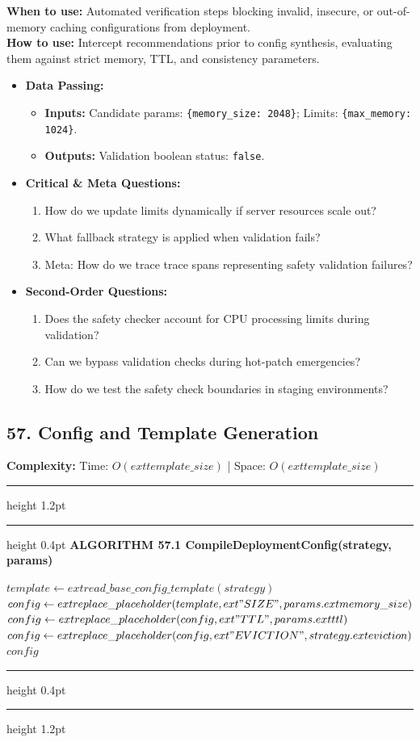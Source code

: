\documentclass[11pt,a4paper]{article}
\newenvironment{textbookalgo}[2]{%
  \par\addvspace{1.2em}\noindent
  \hrule height 1.2pt
  \vspace{1.5pt}
  \hrule height 0.4pt
  \vspace{5pt}
  {\noindent\large\bfseries\sffamily ALGORITHM #1 \quad #2}
  \par\vspace{5pt}
  \RestyleAlgo{plain}
}{%
  \par\vspace{4pt}
  \hrule height 0.4pt
  \vspace{1.5pt}
  \hrule height 1.2pt
  \par\addvspace{1.2em}
}
\theoremstyle{definition}
\begin{document}
\noindent
\textbf{When to use:} Automated verification steps blocking invalid, insecure, or out-of-memory caching configurations from deployment.\\
\textbf{How to use:} Intercept recommendations prior to config synthesis, evaluating them against strict memory, TTL, and consistency parameters.
\begin{itemize}[leftmargin=*]
  \item[] \textbf{Data Passing:}
    \begin{itemize}
      \item \textbf{Inputs:} Candidate params: \texttt{\{memory\_size: 2048\}}; Limits: \texttt{\{max\_memory: 1024\}}.
      \item \textbf{Outputs:} Validation boolean status: \texttt{false}.
    \end{itemize}
  \item[] \textbf{Critical \& Meta Questions:}
  \begin{enumerate}
    \item How do we update limits dynamically if server resources scale out?
    \item What fallback strategy is applied when validation fails?
    \item Meta: How do we trace trace spans representing safety validation failures?
  \end{enumerate}
  \item[] \textbf{Second-Order Questions:}
  \begin{enumerate}
    \item Does the safety checker account for CPU processing limits during validation?
    \item Can we bypass validation checks during hot-patch emergencies?
    \item How do we test the safety check boundaries in staging environments?
  \end{enumerate}
\end{itemize}
\medskip

\clearpage
\subsection{57. Config and Template Generation}


\noindent
\textbf{Complexity:} Time: $O(	ext{template\_size})$ | Space: $O(	ext{template\_size})$
\smallskip

\begin{textbookalgo}{57.1}{CompileDeploymentConfig(strategy, params)}
\begin{algorithm}[H]
$template \leftarrow 	ext{read\_base\_config\_template}(strategy)$\;
$config \leftarrow 	ext{replace\_placeholder}(template, 	ext{"SIZE"}, params.	ext{memory\_size})$\;
$config \leftarrow 	ext{replace\_placeholder}(config, 	ext{"TTL"}, params.	ext{ttl})$\;
$config \leftarrow 	ext{replace\_placeholder}(config, 	ext{"EVICTION"}, strategy.	ext{eviction})$\;
\Return $config$\;
\end{algorithm}
\end{textbookalgo}
\end{document}
